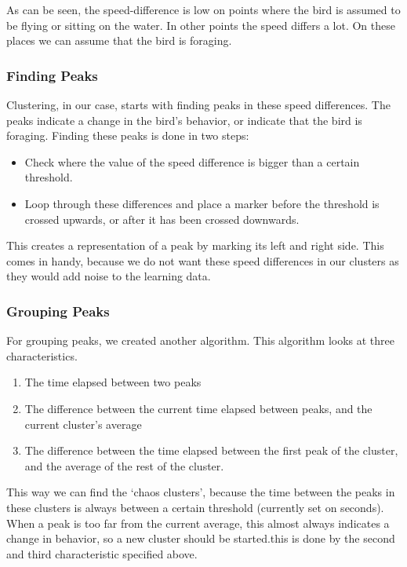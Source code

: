 
As can be seen, the speed-difference is low on points where the bird is assumed
to be flying or sitting on the water. In other points the speed differs a lot.
On these places we can assume that the bird is foraging.


\subsubsection{Finding Peaks}
 Clustering, in our case, starts with finding peaks in these speed differences.
 The peaks indicate a change in the bird's behavior, or indicate that the bird
 is foraging. Finding these peaks is done in two steps:

 \begin{itemize}
    \item Check where the value of the speed difference is bigger than a certain
    threshold.
    \item Loop through these differences and place a marker before the threshold
    is crossed upwards, or after it has been crossed downwards. 
 \end{itemize}
 
 This creates a representation of a peak by marking its left and right side.
 This comes in handy, because we do not want these speed differences in our
 clusters as they would add noise to the learning data.

 \subsubsection{Grouping Peaks}
 For grouping peaks, we created another algorithm. This algorithm looks at three
 characteristics.  
 \begin{enumerate}
 \item The time elapsed between two peaks
 \item The difference between the current time elapsed between peaks, and the
 current cluster's average
 \item The difference between the time elapsed between the first peak of the
 cluster, and the average of the rest of the cluster.
 \end{enumerate}
 This way we can find the `chaos clusters', because the time between the peaks
 in these clusters is always between a certain threshold (currently set on
 \timeThreshold seconds). 
 When a peak is too far from the  current average, this almost always indicates
 a change in behavior, so a new cluster should be started.this is done by the
 second and third characteristic specified above.


